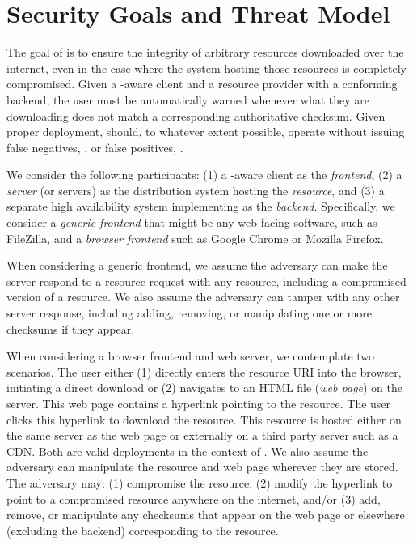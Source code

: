 \section{Security Goals and Threat Model} \label{sec:model}

The goal of \SYSTEM{} is to ensure the integrity of arbitrary resources
downloaded over the internet, even in the case where the system hosting those
resources is completely compromised. Given a \SYSTEM{}-aware client and a
resource provider with a conforming backend, the user must be automatically
warned whenever what they are downloading does not match a corresponding
authoritative checksum. Given proper deployment, \SYSTEM{} should, to whatever
extent possible, operate without issuing false negatives, , or false positives, .

We consider the following participants: (1) a \SYSTEM{}-aware client as the
\emph{frontend}, (2) a \emph{server} (or servers) as the distribution system
hosting the \emph{resource}, and (3) a separate high availability system
implementing \SYSTEM{} as the \emph{backend}. Specifically, we consider a
\emph{generic frontend} that might be any web-facing software, such as
FileZilla, and a \emph{browser frontend} such as Google Chrome or Mozilla
Firefox.

When considering a generic frontend, we assume the adversary can make the server
respond to a resource request with any resource, including a compromised version
of a resource. We also assume the adversary can tamper with any other server
response, including adding, removing, or manipulating one or more checksums if
they appear.

When considering a browser frontend and web server, we contemplate two
scenarios. The user either (1) directly enters the resource URI into the
browser, initiating a direct download or (2) navigates to an HTML file
(\emph{web page}) on the server. This web page contains a hyperlink pointing to
the resource. The user clicks this hyperlink to download the resource. This
resource is hosted either on the same server as the web page or externally on a
third party server such as a CDN. Both are valid deployments in the context of
\SYSTEM{}. We also assume the adversary can manipulate the resource and web page
wherever they are stored. The adversary may: (1) compromise the resource, (2)
modify the hyperlink to point to a compromised resource anywhere on the
internet, and/or (3) add, remove, or manipulate any checksums that appear on the
web page or elsewhere (excluding the backend) corresponding to the resource.

